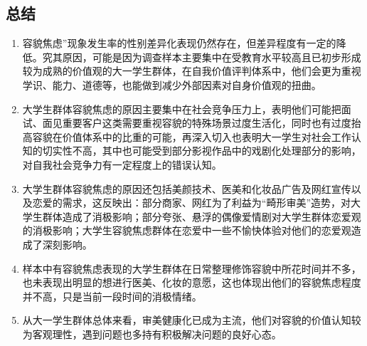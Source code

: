 \subsection{总结}
\begin{enumerate}[leftmargin=7em]
    \item 容貌焦虑''现象发生率的性别差异化表现仍然存在，但差异程度有一定的降低。究其原因，可能是因为调查样本主要集中在受教育水平较高且已初步形成较为成熟的价值观的大一学生群体，在自我价值评判体系中，他们会更为重视学识、能力、道德等，也能做到减少外部因素对自身价值观的扭曲。
    \item 大学生群体容貌焦虑的原因主要集中在社会竞争压力上，表明他们可能把面试、面见重要客户这类需要重视容貌的特殊场景过度生活化，同时也有过度抬高容貌在价值体系中的比重的可能，再深入切入也表明大一学生对社会工作认知的切实性不高，其中也可能受到部分影视作品中的戏剧化处理部分的影响，对自我社会竞争力有一定程度上的错误认知。
    \item 大学生群体容貌焦虑的原因还包括美颜技术、医美和化妆品广告及网红宣传以及恋爱的需求，这反映出：部分商家、网红为了利益为``畸形审美''造势，对大学生群体造成了消极影响；部分夸张、悬浮的偶像爱情剧对大学生群体恋爱观的消极影响；大学生容貌焦虑群体在恋爱中一些不愉快体验对他们的恋爱观造成了深刻影响。
    \item 样本中有容貌焦虑表现的大学生群体在日常整理修饰容貌中所花时间并不多，也未表现出明显的想进行医美、化妆的意愿，这也体现出他们的容貌焦虑程度并不高，只是当前一段时间的消极情绪。
    \item 从大一学生群体总体来看，审美健康化已成为主流，他们对容貌的价值认知较为客观理性，遇到问题也多持有积极解决问题的良好心态。
\end{enumerate}
